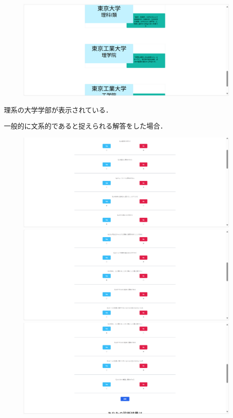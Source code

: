 \documentclass[a4j, titlepage]{jarticle}
\begin{document}
\begin{itemize}
\begin{figure}[h]
\includegraphics{dousakekka-8.png}
\end{figure}
理系の大学学部が表示されている．

一般的に文系的であると捉えられる解答をした場合．
\begin{figure}[h]
\includegraphics{dousakekka-9.png}
\includegraphics{dousakekka-10.png}
\includegraphics{dousakekka-11.png}

\end{figure}
\end{itemize}
\end{document}
